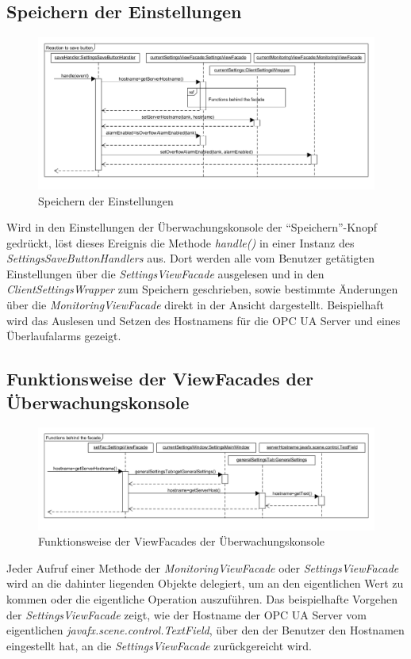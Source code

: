 \documentclass[parskip=full]{scrartcl}
\begin{document}
\subsection{Speichern der Einstellungen}
\begin{figure}[H]
	\centering
	\includegraphics[scale=0.4]{design/sequence-diagrams/save-settings.png}
	\caption{Speichern der Einstellungen}
\end{figure}
Wird in den Einstellungen der Überwachungskonsole der "`Speichern"'-Knopf gedrückt, löst dieses Ereignis die Methode \emph{handle()} in einer Instanz des \emph{SettingsSaveButtonHandlers} aus.
Dort werden alle vom Benutzer getätigten Einstellungen über die \emph{SettingsViewFacade} ausgelesen und in den \emph{ClientSettingsWrapper} zum Speichern geschrieben, sowie bestimmte Änderungen über die \emph{MonitoringViewFacade} direkt in der Ansicht dargestellt.
Beispielhaft wird das Auslesen und Setzen des Hostnamens für die OPC UA Server und eines Überlaufalarms gezeigt.

\subsection{Funktionsweise der ViewFacades der Überwachungskonsole}
\begin{figure}[H]
	\centering
	\includegraphics[scale=0.4]{design/sequence-diagrams/functions-behind-the-facade.png}
	\caption{Funktionsweise der ViewFacades der Überwachungskonsole}
\end{figure}
Jeder Aufruf einer Methode der \emph{MonitoringViewFacade} oder \emph{SettingsViewFacade} wird an die dahinter liegenden Objekte delegiert, um an den eigentlichen Wert zu kommen oder die eigentliche Operation auszuführen. Das beispielhafte Vorgehen der \emph{SettingsViewFacade} zeigt, wie der Hostname der OPC UA Server vom eigentlichen \emph{javafx.scene.control.TextField}, über den der Benutzer den Hostnamen eingestellt hat, an die \emph{SettingsViewFacade} zurückgereicht wird.
\end{document}
